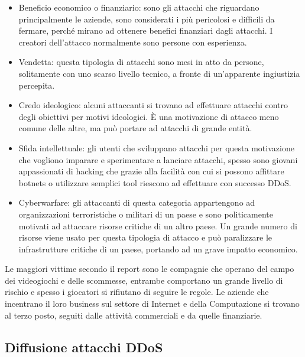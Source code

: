 \begin{itemize}
    \item Beneficio economico o finanziario: sono gli attacchi che riguardano principalmente le aziende, sono considerati i più pericolosi e difficili da fermare, perché mirano ad ottenere benefici finanziari dagli attacchi. I creatori dell'attacco normalmente sono persone con esperienza.
    \item Vendetta: questa tipologia di attacchi sono mesi in atto da persone, solitamente con uno scarso livello tecnico, a fronte di un'apparente ingiustizia percepita.
    \item Credo ideologico: alcuni attaccanti si trovano ad effettuare attacchi contro degli obiettivi per motivi ideologici. È una motivazione di attacco meno comune delle altre, ma può portare ad attacchi di grande entità. %
    \item Sfida intellettuale: gli utenti che sviluppano attacchi per questa motivazione che vogliono imparare e sperimentare a lanciare attacchi, spesso sono giovani appassionati di hacking che grazie alla facilità con cui si possono affittare botnets o utilizzare semplici tool riescono ad effettuare con successo DDoS.
    \item Cyberwarfare: gli attaccanti di questa categoria appartengono ad organizzazioni terroristiche o militari di un paese e sono politicamente motivati ad attaccare risorse critiche di un altro paese. Un grande numero di risorse viene usato per questa tipologia di attacco e può paralizzare le infrastrutture critiche di un paese, portando ad un grave impatto economico.
\end{itemize}



Le maggiori vittime secondo il report \cite{imperva_ddos_report} sono le compagnie che operano del campo dei videogiochi e delle scommesse, entrambe comportano un grande livello di rischio e spesso i giocatori si rifiutano di seguire le regole. Le aziende che incentrano il loro business sul settore di Internet e della Computazione si trovano al terzo posto, seguiti dalle attività commerciali e da quelle finanziarie.


\subsection{Diffusione attacchi DDoS}


